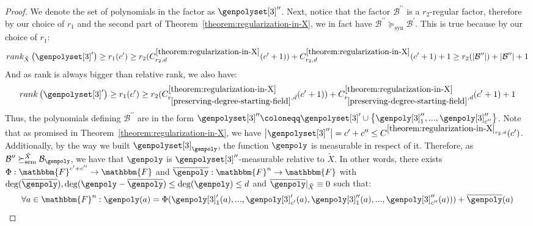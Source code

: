 \documentclass[10pt,a4paper]{article}
\newcommand{\definedas}[0]{\coloneqq}
\newcommand{\parens}[1]{\left( #1 \right)}
\newcommand{\set}[1]{\left\{ #1 \right\}}
\newcommand{\basefield}[0]{\mathbbm{F}}
\newcommand{\blocklength}[0]{n}
\newcommand{\field}[0]{\basefield^{\blocklength}}
\newcommand{\degree}[0]{d}
\newcommand{\funcdef}[3]{#1:#2\rightarrow#3}
\newcommand{\restrictfunc}[2]{#1|_{#2}}
\newcommand{\factor}[0]{\mathcal{B}}
\newcommand{\relsemrefine}[1]{\succeq^{#1}_{\text{sem}}}
\newcommand{\synrefine}[0]{\succeq_{\text{syn}}}
\newcommand{\relativeremainder}[1]{\overline{#1}}
\newcommand{\variety}{{\tilde{X}}}
\newcommand{\rank}[1]{rank \parens{#1}}
\newcommand{\relrank}[2]{rank_{#1} \parens{#2}}
\newcommand{\rankfunc}[0]{{{{r}}}}
\newcommand{\abs}[1]{\left| #1 \right|}
\begin{document}
\begin{proof}
    We denote the set of polynomials in the factor as $\genpolyset[3]^{\prime\prime}$.
    \newline
    Next, notice that the factor $\factor^{\prime\prime}$ is a $\rankfunc_2$-regular factor, therefore by our choice of $\rankfunc_1$ and the second part of Theorem~\ref{theorem:regularization-in-X},
    we in fact have $\factor^{\prime\prime} \synrefine \factor^{\prime}$.
    This is true because by our choice of $\rankfunc_1$:
    \[
        \relrank{\variety}{\genpolyset[3]^\prime} \geq
        \rankfunc_1(c^\prime) \geq
        \rankfunc_2(C_{\rankfunc_2, \degree}^{\ref{theorem:regularization-in-X}}(c^\prime + 1)) + C_{\rankfunc_2, \degree}^{\ref{theorem:regularization-in-X}}(c^\prime + 1) + 1 \geq
        \rankfunc_2(\abs{\factor^{\prime\prime}}) + \abs{\factor^{\prime\prime}}+1
    \]
    And as rank is always bigger than relative rank, we also have:
    \[
        \rank{\genpolyset[3]^\prime} \geq
        \rankfunc_1(c^\prime) \geq
        \rankfunc_2(C_{\rankfunc_{\ref{preserving-degree-starting-field}}, \degree}^{\ref{theorem:regularization-in-X}}(c^\prime + 1))
        + C_{\rankfunc_{\ref{preserving-degree-starting-field}}, \degree}^{\ref{theorem:regularization-in-X}}(c^\prime + 1) + 1
    \]
    Thus, the polynomials defining $\factor^{\prime\prime}$ are in the form $\genpolyset[3]^{\prime\prime} \definedas \genpolyset[3]^{\prime} \cup \set{\genpoly[3]^{\prime\prime}_1,...,\genpoly[3]^{\prime\prime}_{c^{\prime\prime}}}$.
    Note that as promised in Theorem~{\ref{theorem:regularization-in-X}}, we have $\abs{\genpolyset[3]^{\prime\prime}} = c^\prime+c^{\prime\prime} \leq C^{\ref{theorem:regularization-in-X}_{\rankfunc_2, \degree}}(c^\prime)$.
    \newline
    Additionally, by the way we built $\genpolyset[3]_{\genpoly}$, the function $\genpoly$ is measurable in respect of it.
    Therefore, as $\factor^{\prime\prime} \relsemrefine{\variety} \factor_{\genpoly}$, we have that $\genpoly$ is $\genpolyset[3]^{\prime\prime}$-measurable relative to $\variety$.
    In other words, there exists $\funcdef{\Phi}{\basefield^{c^\prime + c^{\prime\prime}}}{\basefield}$
    and $\funcdef{\relativeremainder{\genpoly}}{\field}{\basefield}$ with $\deg(\relativeremainder{\genpoly}), \deg(\genpoly - \relativeremainder{\genpoly}) \leq \deg(\genpoly) \leq \degree$ and $\restrictfunc{\relativeremainder{\genpoly}}{\variety} \equiv 0$ such that:
    \[
        \forall a \in \field: \genpoly(a) = \Phi(\genpoly[3]^\prime_1(a),...,\genpoly[3]^\prime_{c^\prime}(a), \genpoly[3]^{\prime\prime}_1(a),...,\genpoly[3]^{\prime\prime}_{c^{\prime\prime}}(a))) + \relativeremainder{\genpoly}(a)
\]
\end{proof}
\end{document}
